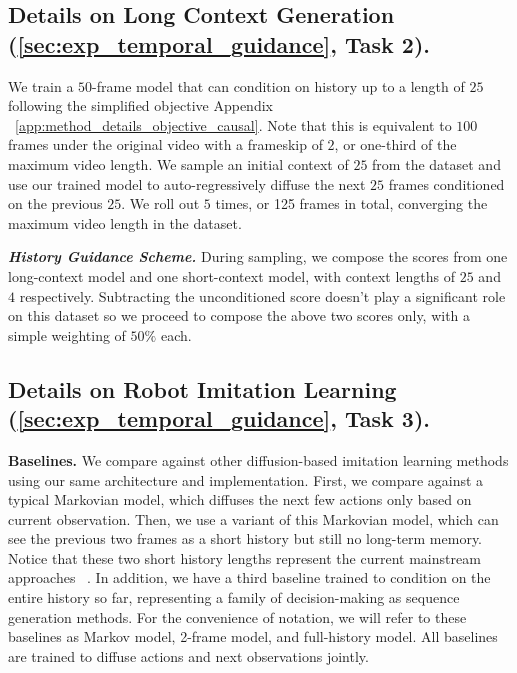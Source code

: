 \subsection{Details on Long Context Generation (\cref{sec:exp_temporal_guidance}, \textbf{Task 2}).}
We train a $50$-frame \mtd model that can condition on history up to a length of $25$ following the simplified objective Appendix ~\ref{app:method_details_objective_causal}. Note that this is equivalent to $100$ frames under the original video with a frameskip of $2$, or one-third of the maximum video length. We sample an initial context of $25$ from the dataset and use our trained model to auto-regressively diffuse the next $25$ frames conditioned on the previous $25$. We roll out $5$ times, or 125 frames in total, converging the maximum video length in the dataset. %

\textbf{\emph{History Guidance Scheme.}}
During sampling, we compose the scores from one long-context model and one short-context model, with context lengths of $25$ and $4$ respectively. Subtracting the unconditioned score doesn't play a significant role on this dataset so we proceed to compose the above two scores only, with a simple weighting of $50\%$ each. 

\subsection{Details on Robot Imitation Learning (\cref{sec:exp_temporal_guidance}, \textbf{Task 3}).} 

\textbf{Baselines.}
We compare against other diffusion-based imitation learning methods using our same architecture and implementation. First, we compare against a typical Markovian model, which diffuses the next few actions only based on current observation. Then, we use a variant of this Markovian model, which can see the previous two frames as a short history but still no long-term memory. Notice that these two short history lengths represent the current mainstream approaches ~\cite{chi2023diffusion}. In addition, we have a third baseline trained to condition on the entire history so far, representing a family of decision-making as sequence generation methods. For the convenience of notation, we will refer to these baselines as Markov model, 2-frame model, and full-history model. All baselines are trained to diffuse actions and next observations jointly.

